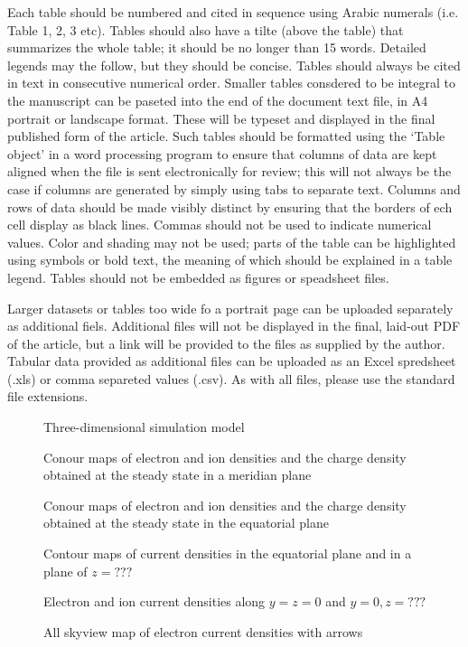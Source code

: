\documentclass{EPS}
\begin{document}
Each table should be numbered and cited in sequence
using Arabic numerals (i.e. Table 1, 2, 3 etc).
Tables should also have a tilte (above the table)
that summarizes the whole table;
it should be no longer than 15 words.
Detailed legends may the follow, but they should be concise.
Tables should always be cited in text in consecutive numerical order.
Smaller tables consdered to be integral to the manuscript can be
paseted into the end of the document text file,
in A4 portrait or landscape format.
These will be typeset and displayed in the final published form
of the article.
Such tables should be formatted using the `Table object'
in a word processing program to ensure that
columns of data are kept aligned when the file is sent
electronically for review;
this will not always be the case if columns are generated by
simply using tabs to separate text.
Columns and rows of data should be made visibly distinct
by ensuring that the borders of ech cell display as black lines.
Commas should not be used to indicate numerical values.
Color and shading may not be used;
parts of the table can be highlighted using symbols or bold text,
the meaning of which should be explained in a table legend.
Tables should not be embedded as figures or speadsheet files.

Larger datasets or tables too wide fo a portrait page
can be uploaded separately as additional fiels.
Additional files will not be displayed in the final,
laid-out PDF of the article, but a link will be provided
to the files as supplied by the author.
Tabular data provided as additional files can be uploaded
as an Excel spredsheet (.xls) or comma separeted values (.csv).
As with all files, please use the standard file extensions.

\begin{figure}
\caption{Three-dimensional simulation model}\label{fig:1}
\end{figure}

\begin{figure}
\caption{Conour maps of electron and ion densities and the charge density 
obtained at the steady state in a meridian plane}\label{fig:2}
\end{figure}

\begin{figure}
\caption{Conour maps of electron and ion densities and the charge density 
obtained at the steady state in the equatorial plane}\label{fig:3}
\end{figure}

\begin{figure}
\caption{Contour maps of current densities in the equatorial plane and in a plane of $z=???$}\label{fig:4}
\end{figure}

\begin{figure}
\caption{Electron and ion current densities along $y=z=0$ and $y=0, z=???$ }\label{fig:5}
\end{figure}

\begin{figure}
\caption{All skyview map of electron current densities with arrows }\label{fig:6}
\end{figure}
\end{document}
